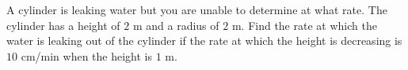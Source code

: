 \begin{exercise}

A cylinder is leaking water but you are unable to determine at what
rate. The cylinder has a height of \(2\) m and a radius of \(2\) m. Find
the rate at which the water is leaking out of the cylinder if the rate
at which the height is decreasing is \(10\) cm/min when the height is
\(1\) m.

\end{exercise}


